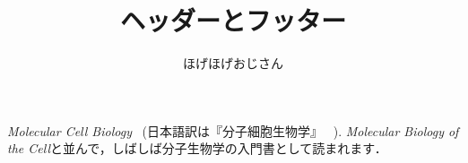 \documentclass[a4paper, 11pt, uplatex]{jsarticle}
\begin{document}
\title{ヘッダーとフッター}
\author{ほげほげおじさん}
\maketitle


\textit{Molecular Cell Biology}~\cite{mcbe} (日本語訳は『分子細胞生物学』 ~\cite{mcb}).
\textit{Molecular Biology of the Cell}と並んで，しばしば分子生物学の入門書として読まれます．


\nocite{*}

\end{document}
